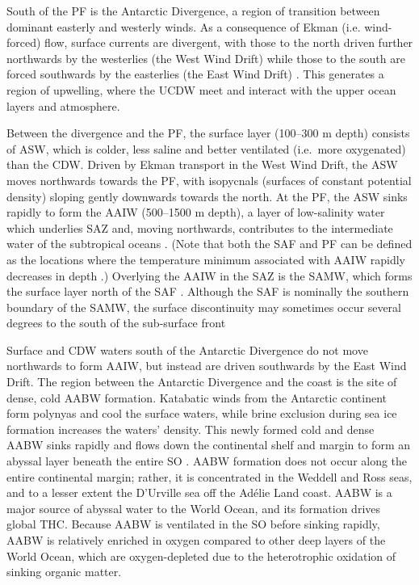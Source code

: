 South of the \ac{PF} is the Antarctic Divergence, a region of transition between dominant easterly and westerly winds.
As a consequence of Ekman (i.e. wind-forced) flow, surface currents are divergent, with those to the north driven further northwards by the westerlies (the West Wind Drift) while those to the south are forced southwards by the easterlies (the East Wind Drift) \cite{Foldvik:1988gp}.
This generates a region of upwelling, where the \ac{UCDW} meet and interact with the upper ocean layers and atmosphere.

Between the divergence and the \ac{PF}, the surface layer (\textapprox{}100--300 m depth) consists of \ac{ASW}, which is colder, less saline and better ventilated (i.e.\ more oxygenated) than the \ac{CDW}.
Driven by Ekman transport in the West Wind Drift, the \ac{ASW} moves northwards towards the \ac{PF}, with isopycnals (surfaces of constant potential density) sloping gently downwards towards the north.
At the \ac{PF}, the \ac{ASW} sinks rapidly to form the \ac{AAIW} (\textapprox{}500--1500 m depth), a layer of low-salinity water which underlies \ac{SAZ} and, moving northwards, contributes to the intermediate water of the subtropical oceans \cite{Foldvik:1988gp}.
(Note that both the \ac{SAF} and \ac{PF} can be defined as the locations where the temperature minimum associated with \ac{AAIW} rapidly decreases in depth \cite{WhitworthIII:1987ky}.)
Overlying the \ac{AAIW} in the \ac{SAZ} is the \ac{SAMW}, which forms the surface layer north of the \ac{SAF} \cite{Speer:2000th}.
Although the \ac{SAF} is nominally the southern boundary of the \ac{SAMW}, the surface discontinuity may sometimes occur several degrees to the south of the sub-surface front \citep[e.g.][]{Deacon:1982ce,Orsi:1995va}

Surface and \ac{CDW} waters south of the Antarctic Divergence do not move northwards to form \ac{AAIW}, but instead are driven southwards by the East Wind Drift.
The region between the Antarctic Divergence and the coast is the site of dense, cold \ac{AABW} formation.
Katabatic winds from the Antarctic continent form polynyas and cool the surface waters, while brine exclusion during sea ice formation increases the waters' density.
This newly formed cold and dense \ac{AABW} sinks rapidly and flows down the continental shelf and margin to form an abyssal layer beneath the entire \ac{SO} \cite{Orsi:1999hz,Foldvik:1988gp}.
\ac{AABW} formation does not occur along the entire continental margin; rather, it is concentrated in the Weddell and Ross seas, and to a lesser extent the D'Urville sea off the Ad\'{e}lie Land coast.
\ac{AABW} is a major source of abyssal water to the World Ocean, and its formation drives global \ac{THC}.
Because \ac{AABW} is ventilated in the \ac{SO} before sinking rapidly, \ac{AABW} is relatively enriched in oxygen compared to other deep layers of the World Ocean, which are oxygen-depleted due to the heterotrophic oxidation of sinking organic matter.

